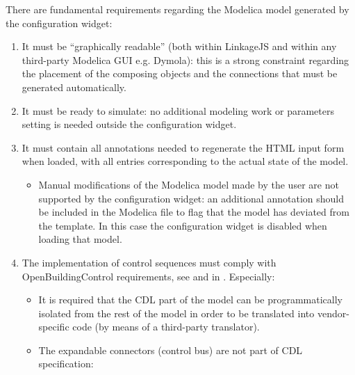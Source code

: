 \documentclass[letterpaper,10pt, openany,english]{sphinxmanual}
\begin{document}
There are fundamental requirements regarding the Modelica model generated by the configuration widget:
\begin{enumerate}
%
\item {} 
It must be “graphically readable” (both within LinkageJS and within any third-party Modelica GUI e.g. Dymola): this is a strong constraint regarding the placement of the composing objects and the connections that must be generated automatically.

\item {} 
It must be ready to simulate: no additional modeling work or parameters setting is needed outside the configuration widget.

\item {} 
It must contain all annotations needed to regenerate the HTML input form when loaded, with all entries corresponding to the actual state of the model.
\begin{itemize}
\item {} 
Manual modifications of the Modelica model made by the user are not supported by the configuration widget: an additional annotation should be included in the Modelica file to flag that the model has deviated from the template. In this case the configuration widget is disabled when loading that model.

\end{itemize}

\item {} 
The implementation of control sequences must comply with OpenBuildingControl requirements, see  and  in . Especially:
\begin{itemize}
\item {} 
It is required that the CDL part of the model can be programmatically isolated from the rest of the model in order to be translated into vendor-specific code (by means of a third-party translator).

\item {} 
The expandable connectors (control bus) are not part of CDL specification: 

\end{itemize}

\end{enumerate}
\end{document}
